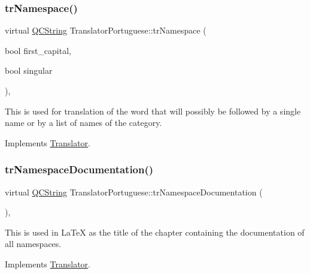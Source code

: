 \subsubsection{\texorpdfstring{trNamespace()}{trNamespace()}}
{\footnotesize\ttfamily virtual \mbox{\hyperlink{class_q_c_string}{Q\+C\+String}} Translator\+Portuguese\+::tr\+Namespace (\begin{DoxyParamCaption}\item[{bool}]{first\+\_\+capital,  }\item[{bool}]{singular }\end{DoxyParamCaption})\hspace{0.3cm}{\ttfamily [inline]}, {\ttfamily [virtual]}}

This is used for translation of the word that will possibly be followed by a single name or by a list of names of the category. 

Implements \mbox{\hyperlink{class_translator}{Translator}}.

\mbox{\label{class_translator_portuguese_adcbf36c3e119120b2b48b87eb20384eb}} 
\subsubsection{\texorpdfstring{trNamespaceDocumentation()}{trNamespaceDocumentation()}}
{\footnotesize\ttfamily virtual \mbox{\hyperlink{class_q_c_string}{Q\+C\+String}} Translator\+Portuguese\+::tr\+Namespace\+Documentation (\begin{DoxyParamCaption}{ }\end{DoxyParamCaption})\hspace{0.3cm}{\ttfamily [inline]}, {\ttfamily [virtual]}}

This is used in La\+TeX as the title of the chapter containing the documentation of all namespaces. 

Implements \mbox{\hyperlink{class_translator}{Translator}}.

\mbox{\label{class_translator_portuguese_a99cccfbd85b7dd8610e9cd4647dccfa3}} 
